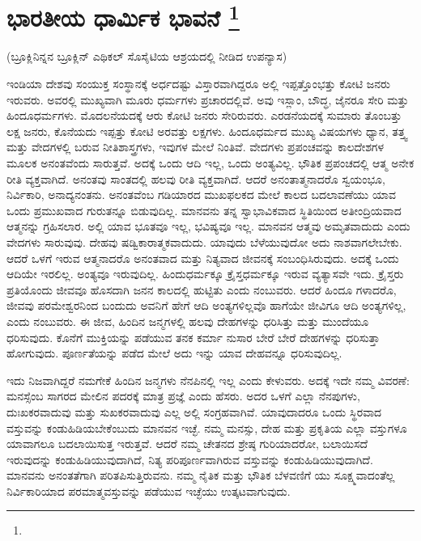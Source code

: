 
\chapter[ಭಾರತೀಯ ಧಾರ್ಮಿಕ ಭಾವನೆ ]{ಭಾರತೀಯ ಧಾರ್ಮಿಕ ಭಾವನೆ \protect\footnote{}}

\centerline{(ಬ್ರೂಕ್ಲಿನಿನ್ನನ ಬ್ರೂಕ್ಲಿನ್​ ಎಥಿಕಲ್​ ಸೊಸೈಟಿಯ ಆಶ್ರಯದಲ್ಲಿ ನೀಡಿದ ಉಪನ್ಯಾಸ)}

ಇಂಡಿಯಾ ದೇಶವು ಸಂಯುಕ್ತ ಸಂಸ್ಥಾನಕ್ಕೆ ಅರ್ಧದಷ್ಟು ವಿಸ್ತಾರವಾಗಿದ್ದರೂ ಅಲ್ಲಿ ಇಪ್ಪತ್ತೊಂಭತ್ತು ಕೋಟಿ ಜನರು ಇರುವರು. ಅವರಲ್ಲಿ ಮುಖ್ಯವಾಗಿ ಮೂರು ಧರ್ಮಗಳು ಪ್ರಚಾರದಲ್ಲಿವೆ. ಅವು ಇಸ್ಲಾಂ, ಬೌದ್ಧ, ಜೈನರೂ ಸೇರಿ ಮತ್ತು ಹಿಂದೂಧರ್ಮಗಳು. ಮೊದಲನೆಯದಕ್ಕೆ ಆರು ಕೋಟಿ ಜನರು ಸೇರಿರುವರು. ಎರಡನೆಯದಕ್ಕೆ ಸುಮಾರು ತೊಂಬತ್ತು ಲಕ್ಷ ಜನರು, ಕೊನೆಯದು ಇಪ್ಪತ್ತು ಕೋಟಿ ಅರವತ್ತು ಲಕ್ಷಗಳು. ಹಿಂದೂಧರ್ಮದ ಮುಖ್ಯ ವಿಷಯಗಳು ಧ್ಯಾನ, ತತ್ತ್ವ ಮತ್ತು ವೇದಗಳಲ್ಲಿ ಬರುವ ನೀತಿಶಾಸ್ತ್ರಗಳು, ಇವುಗಳ ಮೇಲೆ ನಿಂತಿವೆ. ವೇದಗಳು ಪ್ರಪಂಚವನ್ನು ಕಾಲದೇಶಗಳ ಮೂಲಕ ಅನಂತವೆಂದು ಸಾರುತ್ತವೆ. ಅದಕ್ಕೆ ಒಂದು ಆದಿ ಇಲ್ಲ, ಒಂದು ಅಂತ್ಯವಿಲ್ಲ. ಭೌತಿಕ ಪ್ರಪಂಚದಲ್ಲಿ ಆತ್ಮ ಅನೇಕ ರೀತಿ ವ್ಯಕ್ತವಾಗಿದೆ. ಅನಂತವು ಸಾಂತದಲ್ಲಿ ಹಲವು ರೀತಿ ವ್ಯಕ್ತವಾಗಿದೆ. ಆದರೆ ಅನಂತಾತ್ಮನಾದರೊ ಸ್ವಯಂಭೂ, ನಿರ್ವಿಕಾರಿ, ಅನಾದ್ಯನಂತನು. ಅನಂತವೆಂಬ ಗಡಿಯಾರದ ಮುಖಫಲಕದ ಮೇಲೆ ಕಾಲದ ಬದಲಾವಣೆಯು ಯಾವ ಒಂದು ಪ್ರಮುಖವಾದ ಗುರುತನ್ನೂ ಬಿಡುವುದಿಲ್ಲ. ಮಾನವನು ತನ್ನ ಸ್ವಾಭಾವಿಕವಾದ ಸ್ಥಿತಿಯಿಂದ ಅತೀಂದ್ರಿಯವಾದ ಆತ್ಮನನ್ನು ಗ್ರಹಿಸಲಾರ. ಅಲ್ಲಿ ಯಾವ ಭೂತವೂ ಇಲ್ಲ, ಭವಿಷ್ಯವೂ ಇಲ್ಲ. ಮಾನವನ ಆತ್ಮವು ಅಮೃತವಾದುದು ಎಂದು ವೇದಗಳು ಸಾರುವುವು. ದೇಹವು ಷಡ್ವಿಕಾರಾತ್ಮಕವಾದುದು. ಯಾವುದು ಬೆಳೆಯುವುದೋ ಅದು ನಾಶವಾಗಲೇಬೇಕು. ಆದರೆ ಒಳಗೆ ಇರುವ ಆತ್ಮನಾದರೊ ಅನಂತವಾದ ಮತ್ತು ನಿತ್ಯವಾದ ಜೀವನಕ್ಕೆ ಸಂಬಂಧಿಸಿರುವುದು. ಅದಕ್ಕೆ ಒಂದು ಆದಿಯೇ ಇರಲಿಲ್ಲ. ಅಂತ್ಯವೂ ಇರುವುದಿಲ್ಲ. ಹಿಂದುಧರ್ಮಕ್ಕೂ ಕ್ರೈಸ್ತಧರ್ಮಕ್ಕೂ ಇರುವ ವ್ಯತ್ಯಾಸವೇ ಇದು. ಕ್ರೈಸ್ತರು ಪ್ರತಿಯೊಂದು ಜೀವವೂ ಹೊಸದಾಗಿ ಜನನ ಕಾಲದಲ್ಲಿ ಹುಟ್ಟಿತು ಎಂದು ನಂಬುವರು. ಆದರೆ ಹಿಂದೂ ಗಳಾದರೊ, ಜೀವವು ಪರಮೇಶ್ವರನಿಂದ ಬಂದುದು ಅವನಿಗೆ ಹೇಗೆ ಆದಿ ಅಂತ್ಯಗಳಿಲ್ಲವೊ ಹಾಗೆಯೇ ಜೀವಿಗೂ ಆದಿ ಅಂತ್ಯಗಳಿಲ್ಲ, ಎಂದು ನಂಬುವರು. ಈ ಜೀವ, ಹಿಂದಿನ ಜನ್ಮಗಳಲ್ಲಿ ಹಲವು ದೇಹಗಳನ್ನು ಧರಿಸಿತ್ತು ಮತ್ತು ಮುಂದೆಯೂ ಧರಿಸುವುದು. ಕೊನೆಗೆ ಮುಕ್ತಿಯನ್ನು ಪಡೆಯುವ ತನಕ ಕರ್ಮಾ ನುಸಾರ ಬೇರೆ ಬೇರೆ ದೇಹಗಳನ್ನು ಧರಿಸುತ್ತಾ ಹೋಗುವುದು. ಪೂರ್ಣತೆಯನ್ನು ಪಡೆದ ಮೇಲೆ ಅದು ಇನ್ನು ಯಾವ ದೇಹವನ್ನೂ ಧರಿಸುವುದಿಲ್ಲ.

ಇದು ನಿಜವಾಗಿದ್ದರೆ ನಮಗೇಕೆ ಹಿಂದಿನ ಜನ್ಮಗಳು ನೆನಪಿನಲ್ಲಿ ಇಲ್ಲ ಎಂದು ಕೇಳುವರು. ಅದಕ್ಕೆ ಇದೇ ನಮ್ಮ ವಿವರಣೆ: ಮನಸ್ಸೆಂಬ ಸಾಗರದ ಮೇಲಿನ ಪದರಕ್ಕೆ ಮಾತ್ರ ಪ್ರಜ್ಞೆ ಎಂದು ಹೆಸರು. ಅದರ ಒಳಗೆ ಎಲ್ಲಾ ನೆನಪುಗಳು, ದುಃಖಕರವಾದುವು ಮತ್ತು ಸುಖಕರವಾದುವು ಎಲ್ಲ ಅಲ್ಲಿ ಸಂಗ್ರಹವಾಗಿವೆ. ಯಾವುದಾದರೂ ಒಂದು ಸ್ಥಿರವಾದ ವಸ್ತುವನ್ನು ಕಂಡುಹಿಡಿಯಬೇಕೆಂಬುದು ಮಾನವನ ಇಚ್ಛೆ. ನಮ್ಮ ಮನಸ್ಸು, ದೇಹ ಮತ್ತು ಪ್ರಕೃತಿಯ ಎಲ್ಲಾ ವಸ್ತುಗಳೂ ಯಾವಾಗಲೂ ಬದಲಾಯಿಸುತ್ತ ಇರುತ್ತವೆ. ಆದರೆ ನಮ್ಮ ಚೇತನದ ಶ್ರೇಷ್ಠ ಗುರಿಯಾದರೋ, ಬಲಾಯಿಸದೆ ಇರುವುದನ್ನು ಕಂಡುಹಿಡಿಯುವುದಾಗಿದೆ, ನಿತ್ಯ ಪರಿಪೂರ್ಣವಾಗಿರುವ ವಸ್ತುವನ್ನು ಕಂಡುಹಿಡಿಯುವುದಾಗಿದೆ. ಮಾನವನು ಅನಂತತೆಗಾಗಿ ಪರಿತಪಿಸುತ್ತಿರುವನು. ನಮ್ಮ ನೈತಿಕ ಮತ್ತು ಭೌತಿಕ ಬೆಳವಣಿಗೆ ಯು ಸೂಕ್ಷ್ಮವಾದಂತೆಲ್ಲ ನಿರ್ವಿಕಾರಿಯಾದ ಪರಮಾತ್ಮವಸ್ತುವನ್ನು ಪಡೆಯುವ ಇಚ್ಛೆಯು ಉತ್ಕಟವಾಗುವುದು.

